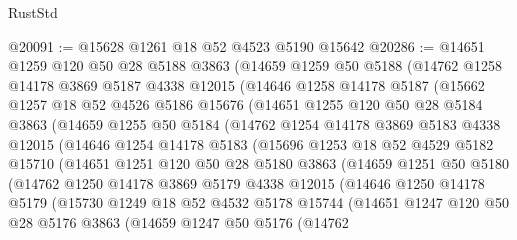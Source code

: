 \begin{lexlean}{RustStd}
\begin{coremodule}
@20091 := @15628 @1261 @18 @52 @4523 @5190 @15642
@20286 := @14651
    @1259
    @120
    @50
    @28
    @5188
    @3863
    (@14659
      @1259
      @50
      @5188
      (@14762
        @1258
        @14178
        @3869
        @5187
        @4338
        @12015
        (@14646
          @1258
          @14178
          @5187
          (@15662
            @1257
            @18
            @52
            @4526
            @5186
            @15676
            (@14651
              @1255
              @120
              @50
              @28
              @5184
              @3863
              (@14659
                @1255
                @50
                @5184
                (@14762
                  @1254
                  @14178
                  @3869
                  @5183
                  @4338
                  @12015
                  (@14646
                    @1254
                    @14178
                    @5183
                    (@15696
                      @1253
                      @18
                      @52
                      @4529
                      @5182
                      @15710
                      (@14651
                        @1251
                        @120
                        @50
                        @28
                        @5180
                        @3863
                        (@14659
                          @1251
                          @50
                          @5180
                          (@14762
                            @1250
                            @14178
                            @3869
                            @5179
                            @4338
                            @12015
                            (@14646
                              @1250
                              @14178
                              @5179
                              (@15730
                                @1249
                                @18
                                @52
                                @4532
                                @5178
                                @15744
                                (@14651
                                  @1247
                                  @120
                                  @50
                                  @28
                                  @5176
                                  @3863
                                  (@14659
                                    @1247
                                    @50
                                    @5176
                                    (@14762

\end{coremodule}
\end{lexlean}
